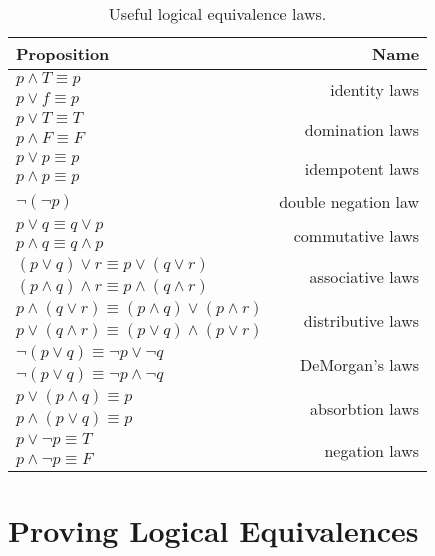 \begin{table}[H]
  \centering
    \begin{tabular}{lr}
      \toprule
      \textbf{Proposition} & \textbf{Name} \\ \midrule
      $p \land T \equiv p$ & \multirow{2}{*}{identity laws} \\
      $p \lor f \equiv p $ \\\midrule
      $p \lor T \equiv T $ & \multirow{2}{*}{domination laws} \\
      $p \land F \equiv F $ \\\midrule
      $p \lor p \equiv p $ & \multirow{2}{*}{idempotent laws} \\
      $p \land p \equiv p $ \\\midrule
      $\neg (\neg p) $ & double negation law \\ \midrule
      $p \lor q \equiv q \lor p $ & \multirow{2}{*}{commutative laws} \\
      $p \land q \equiv q \land p $ \\ \midrule
      $(p \lor q) \lor r \equiv p \lor (q \lor r) $& \multirow{2}{*}{associative laws} \\
      $(p \land q) \land r \equiv p \land (q \land r)$  \\\midrule
      $p \land (q \lor r) \equiv (p \land q) \lor (p \land r)$ & \multirow{2}{*}{distributive laws} \\
      $p \lor (q \land r) \equiv (p \lor q) \land (p \lor r)$ \\\midrule
      $\neg (p \lor q) \equiv \neg p \lor \neg q $ & \multirow{2}{*}{DeMorgan's laws} \\
      $\neg (p \lor q) \equiv \neg p \land \neg q $ \\\midrule
      $p \lor (p \land q) \equiv p $ & \multirow{2}{*}{absorbtion laws} \\
      $p \land (p \lor q) \equiv p $ \\\midrule
      $p \lor \neg p \equiv T $ & \multirow{2}{*}{negation laws} \\
      $p \land \neg p \equiv F $
    \end{tabular}
  \caption{Useful logical equivalence laws.}
  \label{tab:logequiv}
\end{table}

\section{Proving Logical Equivalences}


